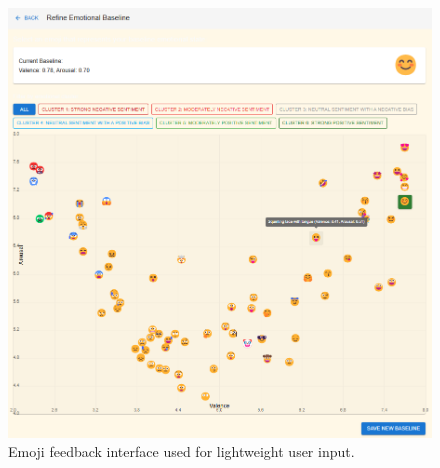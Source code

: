 \begin{figure}[h]
    \centering
    \includegraphics[width=1\textwidth]{img/chapter_03/emoji-feedback-ss.png}
    \caption{Emoji feedback interface used for lightweight user input.}
    \label{fig:emoji_feedback}
\end{figure}


